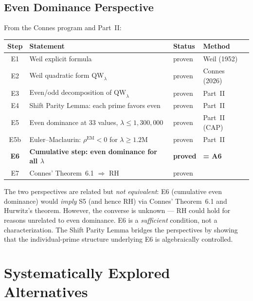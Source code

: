 \documentclass[12pt,a4paper]{article}
\theoremstyle{definition}
\theoremstyle{remark}
\begin{document}
\subsection{Even Dominance Perspective}

From the Connes program and Part~II:

\begin{center}
\renewcommand{\arraystretch}{1.2}
\begin{tabular}{c|l|l|l}
\textbf{Step} & \textbf{Statement} & \textbf{Status} & \textbf{Method} \\\hline
E1 & Weil explicit formula & proven & Weil (1952) \\
E2 & Weil quadratic form $\mathrm{QW}_\lambda$ & proven & Connes (2026) \\
E3 & Even/odd decomposition of $\mathrm{QW}_\lambda$ & proven & Part~II \\
E4 & Shift Parity Lemma: each prime favors even & proven & Part~II \\
E5 & Even dominance at $33$ values, $\lambda \leq 1{,}300{,}000$ & proven & Part~II (CAP) \\
E5b & Euler--Maclaurin: $\rho^{\mathrm{EM}} < 0$ for $\lambda \geq 1.2\mathrm{M}$ & proven & Part~II \\
\textbf{E6} & \textbf{Cumulative step: even dominance for all $\lambda$} & \textbf{proved} & \textbf{= A6} \\
E7 & Connes' Theorem~6.1 $\Rightarrow$ RH & proven & \cite{Connes2026}
\end{tabular}
\end{center}

\noindent The two perspectives are related but \emph{not equivalent}: E6 (cumulative even dominance) would \emph{imply} S5 (and hence RH) via Connes' Theorem~6.1 and Hurwitz's theorem. However, the converse is unknown --- RH could hold for reasons unrelated to even dominance. E6 is a \emph{sufficient} condition, not a characterization. The Shift Parity Lemma bridges the perspectives by showing that the individual-prime structure underlying E6 is algebraically controlled.


\needspace{8cm}
\section{Systematically Explored Alternatives}
\label{sec:explored-alternatives}
\end{document}
